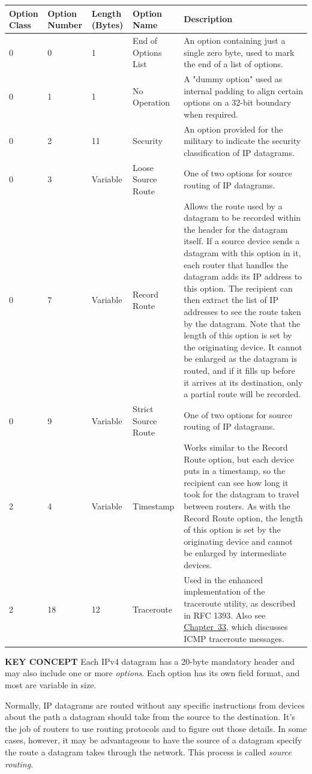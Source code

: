 \documentclass[b5paper,11pt]{memoir}
\begin{document}
\begin{longtable}[]{@{}lllll@{}}
\toprule
Option Class & Option Number & Length (Bytes) & Option Name &
Description\tabularnewline
\midrule
\endhead
0 & 0 & 1 & End of Options List & An option containing just a single
zero byte, used to mark the end of a list of options.\tabularnewline
0 & 1 & 1 & No Operation & A "dummy option" used as internal padding to
align certain options on a 32-bit boundary when required.\tabularnewline
0 & 2 & 11 & Security & An option provided for the military to indicate
the security classification of IP datagrams.\tabularnewline
0 & 3 & Variable & Loose Source Route & One of two options for source
routing of IP datagrams.\tabularnewline
0 & 7 & Variable & Record Route & Allows the route used by a datagram to
be recorded within the header for the datagram itself. If a source
device sends a datagram with this option in it, each router that handles
the datagram adds its IP address to this option. The recipient can then
extract the list of IP addresses to see the route taken by the datagram.
Note that the length of this option is set by the originating device. It
cannot be enlarged as the datagram is routed, and if it fills up before
it arrives at its destination, only a partial route will be
recorded.\tabularnewline
0 & 9 & Variable & Strict Source Route & One of two options for source
routing of IP datagrams.\tabularnewline
2 & 4 & Variable & Timestamp & Works similar to the Record Route option,
but each device puts in a timestamp, so the recipient can see how long
it took for the datagram to travel between routers. As with the Record
Route option, the length of this option is set by the originating device
and cannot be enlarged by intermediate devices.\tabularnewline
2 & 18 & 12 & Traceroute & Used in the enhanced implementation of the
traceroute utility, as described in RFC 1393. Also see
\protect\hyperlink{ch33.html}{Chapter~33}, which discusses ICMP
traceroute messages.\tabularnewline
\bottomrule
\end{longtable}


{\textbf{KEY CONCEPT}} Each IPv4 datagram has a 20-byte mandatory header
and may also include one or more {\emph{options}}. Each option has its
own field format, and most are variable in size.

Normally, IP datagrams are routed without any specific instructions from
devices about the path a datagram should take from the source to the
destination. It's the job of routers to use routing protocols and to
figure out those details. In some cases, however, it may be advantageous
to have the source of a datagram specify the route a datagram takes
through the network. This process is called {\emph{source routing}}.
\end{document}
